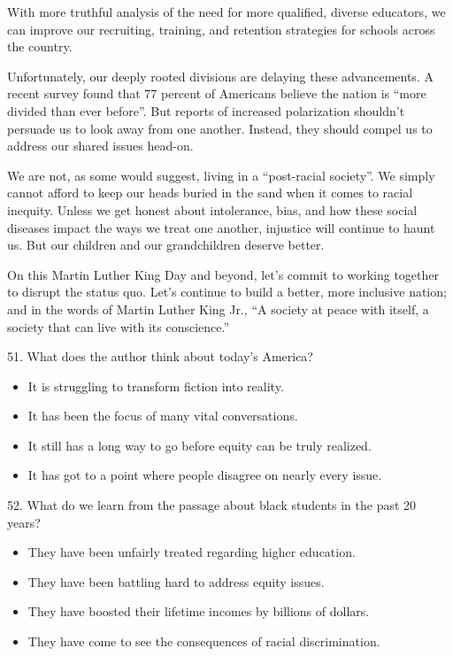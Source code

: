 \documentclass[UTF8,11pt]{ctexart}
\begin{document}
With more truthful analysis of the need for more qualified, diverse educators, we can improve our recruiting, training, and retention strategies for schools across the country.


Unfortunately, our deeply rooted divisions are delaying these advancements. A recent survey found that 77 percent of Americans believe the nation is “more divided than ever before”. But reports of increased polarization shouldn’t persuade us to look away from one another. Instead, they should compel us to address our shared issues head-on.


We are not, as some would suggest, living in a “post-racial society”. We simply cannot afford to keep our heads buried in the sand when it comes to racial inequity. Unless we get honest about intolerance, bias, and how these social diseases impact the ways we treat one another, injustice will continue to haunt us. But our children and our grandchildren deserve better.


On this Martin Luther King Day and beyond, let’s commit to working together to disrupt the status quo. Let’s continue to build a better, more inclusive nation; and in the words of Martin Luther King Jr., “A society at peace with itself, a society that can live with its conscience.”


51. What does the author think about today’s America?


\begin{itemize}[leftmargin=2em,itemsep=.2em,topsep=.4em]\item[A.] It is struggling to transform fiction into reality.
\item[B.] It has been the focus of many vital conversations.
\item[C.] It still has a long way to go before equity can be truly realized.
\item[D.] It has got to a point where people disagree on nearly every issue.
\end{itemize}

52. What do we learn from the passage about black students in the past 20 years?


\begin{itemize}[leftmargin=2em,itemsep=.2em,topsep=.4em]\item[A.] They have been unfairly treated regarding higher education.
\item[B.] They have been battling hard to address equity issues.
\item[C.] They have boosted their lifetime incomes by billions of dollars.
\item[D.] They have come to see the consequences of racial discrimination.
\end{itemize}
\end{document}
